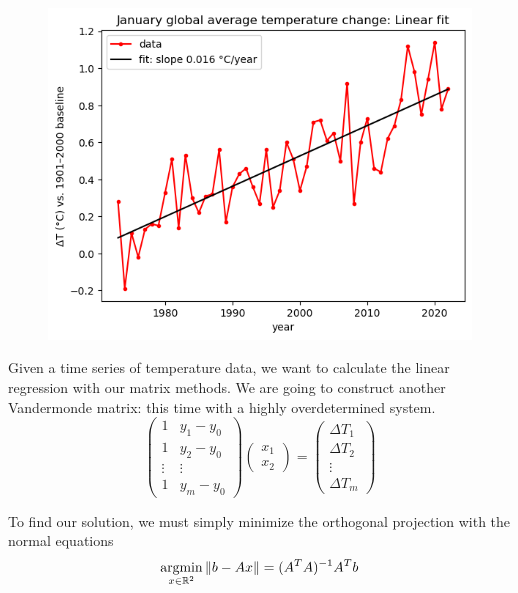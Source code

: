 \documentclass[11pt]{article}
\begin{document}
\begin{examplebox}
		\begin{figure}
		\includegraphics[width=\linewidth]{figs/linreg.png}
    \end{figure}
	\nident Given a time series of temperature data, we want to calculate the linear regression with our matrix methods. We are going to construct another Vandermonde matrix: this time with a highly overdetermined system. 
	$$\begin{pmatrix}
	  1 & y_1 - y_0\\
	1 & y_2 - y_0\\
	\vdots & \vdots\\
	1 & y_m - y_0
	\end{pmatrix}\begin{pmatrix}
	  x_1 \\
	x_2
	\end{pmatrix}
	= \begin{pmatrix}
	  \Delta T_1\\
	\Delta T_2\\
	\vdots\\
	\Delta T_m
	\end{pmatrix}$$

	To find our solution, we must simply minimize the orthogonal projection with the normal equations
	$$\displaystyle \operatorname*{argmin}_{x \in \mathbb{R}^{2}} \|b-Ax\| = (A^{T}A)^{-1}A^{T}b$$
\end{examplebox}
	\vspace{0.5cm}
	\begin{itemize}
\end{itemize}
\end{document}
